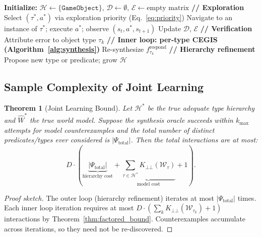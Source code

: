 \documentclass{article}
\newtheorem{theorem}{Theorem}
\newcommand{\calD}{\mathcal{D}}
\newcommand{\calE}{\mathcal{E}}
\newcommand{\calH}{\mathcal{H}}
\newcommand{\calW}{\mathcal{W}}
\begin{document}
\begin{algorithm}[h]
\caption{OOP World Model Learning (Full System)}
\label{alg:main}
\begin{algorithmic}[1]
\STATE \textbf{Initialize:} $\calH \leftarrow \{\texttt{GameObject}\}$,
       $\calD \leftarrow \emptyset$, $\calE \leftarrow \text{empty matrix}$
\REPEAT
    \STATE \textbf{// Exploration}
    \STATE Select $(\tau^*, a^*)$ via exploration priority
           (Eq.~\ref{eq:priority})
    \STATE Navigate to an instance of $\tau^*$; execute $a^*$; observe
           $(s_t, a^*, s_{t+1})$
    \STATE Update $\calD$, $\calE$
    \STATE \textbf{// Verification}
        \STATE Attribute error to object type $\tau_k$
        \STATE \textbf{// Inner loop: per-type CEGIS (Algorithm~\ref{alg:synthesis})}
        \STATE Re-synthesize $f_{\tau_k}^{\text{respond}}$
            \STATE \textbf{// Hierarchy refinement}
            \STATE Propose new type or predicate; grow $\calH$
        \ENDIF
    \ENDIF
{}
\end{algorithmic}
\end{algorithm}

\subsection{Sample Complexity of Joint Learning}
\label{sec:joint_bound}

\begin{theorem}[Joint Learning Bound]
\label{thm:joint}
Let $\calH^*$ be the true adequate type hierarchy and $\hat{W}^*$ the true
world model.  Suppose the synthesis oracle succeeds within $k_{\max}$ attempts
for model counterexamples and the total number of distinct predicates/types
ever considered is $|\Psi_{\text{total}}|$.  Then the total interactions are
at most:
\begin{equation}
    D \cdot \left(
        \underbrace{|\Psi_{\text{total}}|}_{\text{hierarchy cost}}
        + \underbrace{\sum_{\tau \in \calH^*}
        K_{\bot\!\!\bot}(\calW_\tau)}_{\text{model cost}}
        + 1
    \right).
\end{equation}
\end{theorem}

\begin{proof}[Proof sketch]
The outer loop (hierarchy refinement) iterates at most $|\Psi_{\text{total}}|$
times.  Each inner loop iteration requires at most
$D \cdot (\sum_k K_{\bot\!\!\bot}(\calW_{\tau_k}) + 1)$ interactions by
Theorem~\ref{thm:factored_bound}.  Counterexamples accumulate across
iterations, so they need not be re-discovered.
\end{proof}
\end{document}
